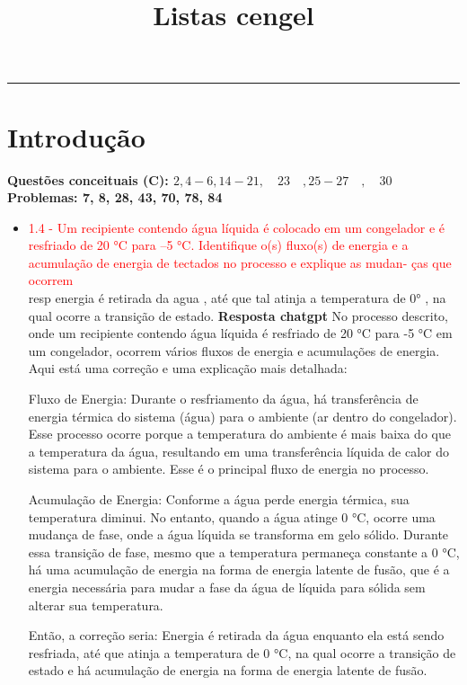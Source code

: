 \documentclass{article}
\date{} %
\title{Listas cengel}
\begin{document}
\maketitle
\tableofcontents
\setlength{\parindent}{8pt}
\noindent\rule{\textwidth}{0.4pt}


\newpage
\section{Introdução}
\textbf {Questões conceituais (C):
$2, 4-6, 14-21, \quad 23 \quad , 25-27 \quad , \quad 30$}\\
\textbf{Problemas:
7, 8, 28, 43, 70, 78, 84
}
\begin{itemize}
    \item \textcolor{red}{
     1.4 - Um recipiente contendo água líquida é colocado em um congelador e é resfriado de 20 °C para –5 °C. Identifique o(s) fluxo(s) de energia e a acumulação de energia de tectados no processo e explique as mudan- ças que ocorrem}\\
    resp energia é retirada da agua , até que tal atinja a temperatura de 0° , na qual ocorre a transição de estado.
    \textbf{Resposta chatgpt}
    No processo descrito, onde um recipiente contendo água líquida é resfriado de 20 °C para -5 °C em um congelador, ocorrem vários fluxos de energia e acumulações de energia. Aqui está uma correção e uma explicação mais detalhada:

Fluxo de Energia: Durante o resfriamento da água, há transferência de energia térmica do sistema (água) para o ambiente (ar dentro do congelador). Esse processo ocorre porque a temperatura do ambiente é mais baixa do que a temperatura da água, resultando em uma transferência líquida de calor do sistema para o ambiente. Esse é o principal fluxo de energia no processo.

Acumulação de Energia: Conforme a água perde energia térmica, sua temperatura diminui. No entanto, quando a água atinge 0 °C, ocorre uma mudança de fase, onde a água líquida se transforma em gelo sólido. Durante essa transição de fase, mesmo que a temperatura permaneça constante a 0 °C, há uma acumulação de energia na forma de energia latente de fusão, que é a energia necessária para mudar a fase da água de líquida para sólida sem alterar sua temperatura.

Então, a correção seria: Energia é retirada da água enquanto ela está sendo resfriada, até que atinja a temperatura de 0 °C, na qual ocorre a transição de estado e há acumulação de energia na forma de energia latente de fusão.


\end{itemize}
\end{document}
